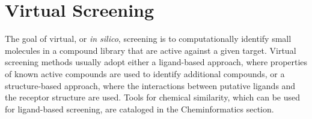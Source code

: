 \section{Virtual Screening}

The goal of virtual, or \textit{in silico}, screening is to computationally identify small molecules in a compound library that are active against a given target.  Virtual screening methods usually adopt either a ligand-based approach, where properties of known active compounds are used to identify additional compounds, or a structure-based approach, where the interactions between putative ligands and the receptor structure are used.  Tools for chemical similarity, which can be used for ligand-based screening, are cataloged in the Cheminformatics section.
